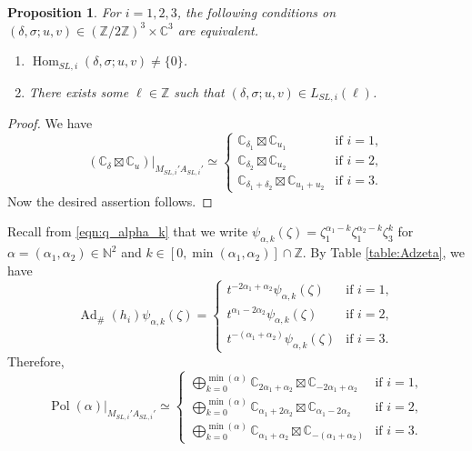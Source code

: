 \documentclass[a4paper,11pt,reqno]{amsart}
\newcommand{\0}{{\bf 0}}
\newcommand{\N}{\mathbb{N}}
\newcommand{\Z}{\mathbb{Z}}
\newcommand{\C}{\mathbb{C}}
\newcommand{\1}{{\bf 1}}
\DeclareMathOperator{\Ad}{Ad}
\DeclareMathOperator{\Hom}{Hom}
\DeclareMathOperator{\Pol}{Pol}
\theoremstyle{plain}
\newtheorem{proposition}[equation]{Proposition}
\theoremstyle{definition}
\numberwithin{equation}{section}
\theoremstyle{definition}
\begin{document}
\begin{proposition}\label{prop:Invariants_SL} 
For $i=1,2,3$, 
the following conditions on 
$(\delta,\sigma; u, v) \in (\Z/2\Z)^3\times \C^3$
are equivalent.
\begin{enumerate}[label=\normalfont{(\roman*)}]
    \item $\Hom_{SL,i}(\delta,\sigma; u, v)\neq \{0\}$.
    \item There exists some $\ell\in \Z$ such that 
    $(\delta,\sigma; u, v) \in L_{SL, i}(\ell)$.
\end{enumerate}
\end{proposition}

\begin{proof}
We have 
\begin{equation*}
(\C_\delta\boxtimes \C_{u})
\big\rvert_{M_{SL,i}'A_{SL,i}'}
\simeq
\begin{cases}
\C_{\delta_1}\boxtimes \C_{u_1} &\text{if $i=1$}, \\[3pt]
\C_{\delta_2}\boxtimes \C_{u_2} &\text{if $i=2$}, \\[3pt]
\C_{\delta_1+\delta_2}\boxtimes \C_{u_1+u_2} &\text{if $i=3$}.
\end{cases}
\end{equation*}
Now the desired assertion follows.
\end{proof}

Recall from \eqref{eqn:q_alpha_k} that
we write
$\psi_{\alpha, k}(\zeta)=\zeta_1^{\alpha_1-k}\zeta_1^{\alpha_2-k}\zeta_3^{k}$
for $\alpha=(\alpha_1, \alpha_2) \in \N^2$ and 
$k \in [0,\min(\alpha_1,\alpha_2)] \cap \Z$.
By Table \ref{table:Adzeta}, we have 
\begin{equation*}
\Ad_{\#}(h_i)\psi_{\alpha, k}(\zeta)
=
\begin{cases}
t^{-2\alpha_1+\alpha_2}\psi_{\alpha, k}(\zeta) &\text{if $i=1$},\\[3pt]
t^{\alpha_1-2\alpha_2}\psi_{\alpha, k}(\zeta) &\text{if $i=2$},\\[3pt]
t^{-(\alpha_1+\alpha_2)}\psi_{\alpha, k}(\zeta) &\text{if $i=3$}.
\end{cases}
\end{equation*}
Therefore,
\begin{equation*}
\Pol(\alpha)\big\vert_{M_{SL,i}'A_{SL,i}'}
\simeq 
\begin{cases}
\bigoplus_{k =0}^{\min(\alpha)}
\C_{2\alpha_1+\alpha_2}\boxtimes
\C_{-2\alpha_1+\alpha_2} &\text{if $i=1$},\\[10pt]
\bigoplus_{k =0}^{\min(\alpha)}
\C_{\alpha_1+2\alpha_2}\boxtimes
\C_{\alpha_1-2\alpha_2} &\text{if $i=2$}, \\[10pt]
\bigoplus_{k =0}^{\min(\alpha)}
\C_{\alpha_1+\alpha_2}\boxtimes
\C_{-(\alpha_1+\alpha_2)} &\text{if $i=3$}.
\end{cases}
\end{equation*}
\end{document}
